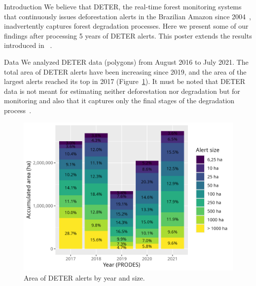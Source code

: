 \documentclass[20pt]{beamer}
\begin{document}
\vspace*{-2cm}
\begin{frame}[fragile,t]
\begin{columns}[t]




\begin{column}{0.33\linewidth}

\vspace{0.5cm}

    \begin{block}{Introduction\vphantom{g}}
        We believe that DETER, the real-time forest monitoring systems that continuously issues deforestation alerts in the Brazilian Amazon since 2004~\cite{shimabukuro2006}, inadvertently captures forest degradation processes.
        Here we present some of our findings after processing 5 years of DETER alerts.
        This poster extends the results introduced in ~\cite{sanchez2023}.
    \end{block}

\vspace{0.5cm}

    \begin{block}{Data}
        We analyzed DETER data (polygons) from August 2016 to July 2021.
        The total area of DETER alerts have been increasing since 2019, and the area of the largest alerts reached its top in 2017 (Figure~\ref{fig:deter_warnings_area_size}).
        It must be noted that DETER data is not meant for estimating neither deforestation nor degradation but for monitoring and also that it captures only the final stages of the degradation process~\cite{dealmeida2022}.

\begin{figure}[h] 
    \begin{center}
    \includegraphics[width=\linewidth]{./figures/deter_warnings_area_size.png}
        \caption{Area of DETER alerts by year and size.}
    \label{fig:deter_warnings_area_size}
    \end{center}
\end{figure}


\end{block}
\end{column}
\end{columns}
\end{frame}
\end{document}
